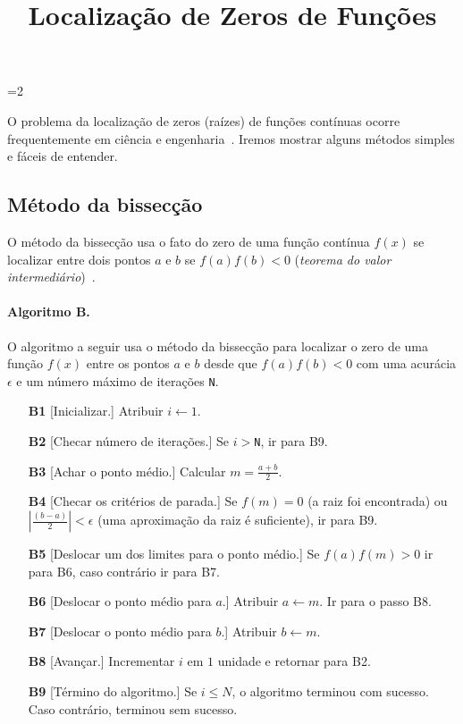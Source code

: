 
\title{Localização de Zeros de Funções}
\frame{\maketitle}

\frame{\tableofcontents}

=2

O problema da localização de zeros (raízes) 
de funções contínuas ocorre frequentemente 
em ciência e engenharia~\cite{hamming}.
Iremos mostrar alguns métodos simples 
e fáceis de entender.

\subsection*{Método da bissecção}

O método da bissecção usa o fato do zero de uma 
função contínua $f(x)$ se localizar entre dois 
pontos $a$ e $b$ se $f(a)f(b)<0$ 
({\it teorema do valor intermediário\/})~\cite{numrec}.

\paragraph{Algoritmo B.}
O algoritmo a seguir usa o método da bissecção para 
localizar o zero de uma função $f(x)$ 
entre os pontos $a$ e $b$ desde que $f(a)f(b)<0$ 
com uma acurácia $\epsilon$ e um número máximo 
de iterações {\tt N}.

\begin{itemize}
\item[\bf B1] [Inicializar.] Atribuir $i \leftarrow 1$.
\item[\bf B2] [Checar número de iterações.] Se $i>${\tt N}, 
		ir para B9.

	\item[\bf B3] [Achar o ponto médio.] Calcular $m = \frac{a+b}{2}$.

\item[\bf B4] [Checar os critérios de parada.] Se $f(m)=0$
	(a raiz foi encontrada)
		ou \hbox{$|\frac{(b-a)}{2}| < \epsilon$} (uma aproximação da
	raiz é suficiente), ir para B9.

\item[\bf B5] [Deslocar um dos limites para o ponto médio.]
	Se $f(a)f(m)>0$ ir para B6, caso contrário 
	ir para B7.

\item[\bf B6] [Deslocar o ponto médio para $a$.] Atribuir
	$a\leftarrow m$. Ir para o passo B8.

\item[\bf B7] [Deslocar o ponto médio para $b$.] Atribuir
	$b\leftarrow m$.

\item[\bf B8] [Avançar.] Incrementar $i$ em $1$ unidade e
	retornar para B2.

\item[\bf B9] [Término do algoritmo.] Se $i\leq N$, o algoritmo
	terminou com sucesso. Caso contrário, terminou 
	sem sucesso.\quad\pfbox
\end{itemize}


